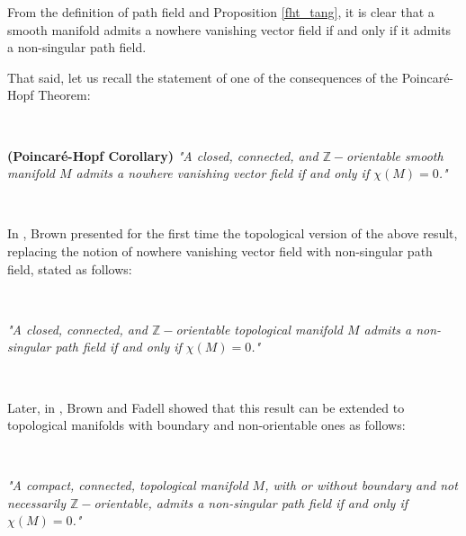 \documentclass[12pt,oneside]{book}
\newcommand{\Z}{\mathbb{Z}}
\begin{document}
    From the definition of path field and Proposition \ref{fht_tang}, it is clear that a smooth manifold admits a nowhere vanishing vector 
    field if and only if it admits a non-singular path field.

    That said, let us recall the statement of one of the consequences of the Poincaré-Hopf Theorem:

    \

    \begin{center}
    	\begin{minipage}{10cm}
    		\textbf{(Poincaré-Hopf Corollary)} \textit{"A closed, connected, and $\Z-$orientable smooth manifold 
            $M$ admits a nowhere vanishing vector field if and only if $\chi(M)=0$."}
    	\end{minipage}
    \end{center}

    \

    In \cite{brown}, Brown presented for the first time the topological version of the above result, replacing the notion of nowhere vanishing 
    vector field with non-singular path field, stated as follows:

    \

    \begin{center}
    	\begin{minipage}{10cm}
    		\textit{"A closed, connected, and $\Z-$orientable topological manifold $M$ admits a non-singular path field if and only if 
            $\chi(M)=0$."}
    	\end{minipage}
    \end{center}

    \

    Later, in \cite{brown_2}, Brown and Fadell showed that this result can be extended to topological manifolds with boundary and 
    non-orientable ones as follows:

    \

    \begin{center}
    	\begin{minipage}{10cm}
    		\textit{"A compact, connected, topological manifold $M$, with or without boundary and not necessarily $\Z-$orientable, admits a 
            non-singular path field if and only if $\chi(M)=0$."}
    	\end{minipage}
    \end{center}

    \
\end{document}

